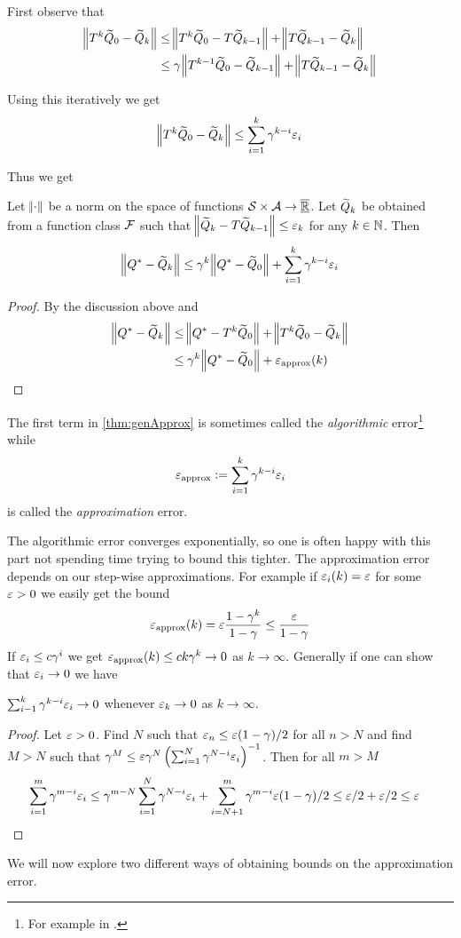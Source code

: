 First observe that
\begin{align*}
  \norm{T^k \widetilde{Q}_0 - \widetilde{Q}_k}
  &\leq \norm{T^k \widetilde{Q}_0 - T \widetilde{Q}_{k-1}} + \norm{T\widetilde{Q}_{k-1} - \widetilde{Q}_k}
  \\ &\leq \gamma \norm{T^{k-1} \widetilde{Q}_0 - \widetilde{Q}_{k-1}}
  + \norm{T\widetilde{Q}_{k-1} - \widetilde{Q}_k}
\end{align*}

Using this iteratively we get
\[ \norm{T^k \widetilde{Q}_0 - \widetilde{Q}_k} \leq \sum_{i=1}^k \gamma^{k-i} \varepsilon_i \]

Thus we get
\begin{thm}
  Let $\norm{\cdot}$ be a norm on the space of functions
  $\mathcal{S} \times \mathcal{A} \to \overline{\underline{\mathbb{R}}}$.
  Let $\widetilde{Q}_k$ be obtained from a function class $\mathcal{F}$
  such that $\norm{\widetilde{Q}_{k} - T\widetilde{Q}_{k-1}} \leq \varepsilon_k$
  for any $k \in \mathbb{N}$. Then
  \[ \norm{Q^* - \widetilde{Q}_k} \leq \gamma^k \norm{Q^* - \widetilde{Q}_0}
  + \sum_{i=1}^k \gamma^{k-i} \varepsilon_i \]
  \label{thm:genApprox}
\end{thm}
\begin{proof}
  By the discussion above and
  \begin{align*}
    \norm{Q^* - \widetilde{Q}_k}
    &\leq \norm{Q^* - T^k \widetilde{Q}_0} + \norm{T^k \widetilde{Q}_0 - \widetilde{Q}_k}
    \\ &\leq \gamma^k \norm{Q^* - \widetilde{Q}_0}
    + \varepsilon_{\mathrm{approx}}(k)
  \end{align*}
\end{proof}
The first term in \cref{thm:genApprox} is sometimes called the
\emph{algorithmic} error\footnote{For example in .} while
\[ \varepsilon_{\mathrm{approx}} \vcentcolon= \sum_{i=1}^k \gamma^{k-i} \varepsilon_i \]
is called the \emph{approximation} error.

The algorithmic error converges exponentially, so one is often happy with this
part not spending time trying to bound this tighter.
The approximation error depends on our step-wise approximations. For example
if $\varepsilon_i(k) = \varepsilon$ for some $\varepsilon > 0$ we easily get the bound
\begin{equation}
  \varepsilon_{\mathrm{approx}}(k) = \varepsilon \frac{1-\gamma^k}{1-\gamma} \leq \frac{\varepsilon}{1-\gamma}
  \label{eq:approxEpsBound}
\end{equation}
If $\varepsilon_i \leq c\gamma^i$ we get $\varepsilon_{\mathrm{approx}}(k) \leq ck \gamma^k \to 0$ as
$k \to \infty$.
Generally if one can show that $\varepsilon_i \to 0$ we have
\begin{prop} $ \sum_{i-1}^k \gamma^{k-i} \varepsilon_i \to 0 $
  whenever $\varepsilon_k \to 0$ as $k \to \infty$.
\end{prop}
\begin{proof}
  Let $\varepsilon > 0$. Find $N$ such that $\varepsilon_n \leq \varepsilon (1-\gamma)/2$ 
  for all $n>N$ and find $M>N$ such that
  $\gamma^M \leq
  \varepsilon \gamma^N \left( \sum_{i=1}^N \gamma^{N-i} \varepsilon_i \right)^{-1}$.
  Then for all $m>M$
  \begin{align*}
    \sum_{i=1}^m \gamma^{m-i} \varepsilon_i
    &\leq \gamma^{m-N} \sum_{i=1}^N \gamma^{N-i} \varepsilon_i
    + \sum_{i=N+1}^m \gamma^{m-i} \varepsilon (1-\gamma)/2
    \leq \varepsilon/2 + \varepsilon/2 \leq \varepsilon
  \end{align*}
\end{proof}
We will now explore two different ways of obtaining bounds on the approximation 
error.

